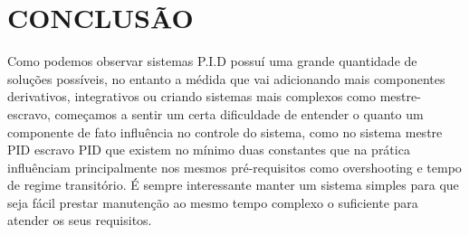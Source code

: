 \documentclass[a4paper,12pt]{article}
\begin{document}
\thispagestyle{main}

\section{CONCLUSÃO}\hspace{4ex}
Como podemos observar sistemas P.I.D possuí uma grande quantidade de soluções possíveis, no entanto a médida que vai adicionando mais
componentes derivativos, integrativos ou criando sistemas mais complexos como mestre-escravo, começamos a sentir um certa dificuldade de entender
o quanto um componente de fato influência no controle do sistema, como no sistema mestre PID escravo PID que existem no mínimo duas constantes
que na prática influênciam principalmente nos mesmos pré-requisitos como overshooting e tempo de regime transitório. É sempre interessante
manter um sistema simples para que seja fácil prestar manutenção ao mesmo tempo complexo o suficiente para atender os seus requisitos. 
\newpage




{}


\appendix


\end{document}
